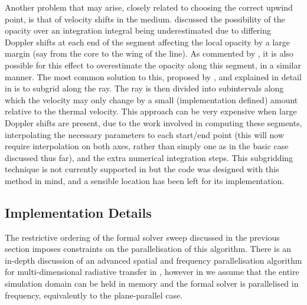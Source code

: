 Another problem that may arise, closely related to choosing the correct upwind point, is that of velocity shifts in the medium.
\citet{VanNoort2002} discussed the possibility of the opacity over an integration integral being underestimated due to differing Doppler shifts at each end of the segment affecting the local opacity by a large margin (say from the core to the wing of the line).
As commented by \citet{Ibgui2013}, it is also possible for this effect to overestimate the opacity along this segment, in a similar manner.
The most common solution to this, proposed by \citet{VanNoort2002}, and explained in detail in \citet{Ibgui2013} is to subgrid along the ray.
The ray is then divided into subintervals along which the velocity may only change by a small (implementation defined) amount relative to the thermal velocity.
This approach can be very expensive when large Doppler shifts are present, due to the work involved in computing these segments, interpolating the necessary parameters to each start/end point (this will now require interpolation on both axes, rather than simply one as in the basic case discussed thus far), and the extra numerical integration steps.
This subgridding technique is not currently supported in \Lw{} but the code was designed with this method in mind, and a sensible location has been left for its implementation.

\subsection{Implementation Details}

The restrictive ordering of the formal solver sweep discussed in the previous section imposes constraints on the parallelisation of this algorithm.
There is an in-depth discussion of an advanced spatial and frequency parallelisation algorithm for multi-dimensional radiative transfer in \citet{Stepan2013}, however in \Lw{} we assume that the entire simulation domain can be held in memory and the formal solver is parallelised in frequency, equivalently to the plane-parallel case.

